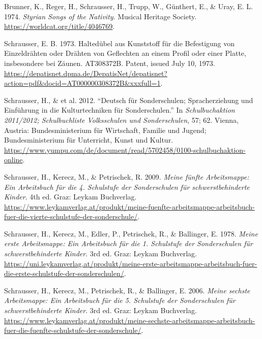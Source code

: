 \documentclass[
]{article}
\author{}
\date{}
\newlength{\cslhangindent}
\newlength{\cslentryspacingunit} %
\newenvironment{CSLReferences}[2] %
 {%
  \setlength{\parindent}{0pt}
  \ifodd #1
  \let\oldpar\par
  \def\par{\hangindent=\cslhangindent\oldpar}
  \fi
  \setlength{\parskip}{#2\cslentryspacingunit}
 }%
 {}
\begin{document}
\hypertarget{refs}{}
\begin{CSLReferences}{1}{0}
\leavevmode{}%
Brunner, K., Reger, H., Schrausser, H., Trupp, W., Günthert, E., \&
Uray, E. L. 1974. \emph{Styrian Songs of the Nativity}. Musical Heritage
Society. \url{https://worldcat.org/title/4046769}.

\leavevmode{}%
Schrausser, E. B. 1973. {Haltedübel aus Kunststoff für die Befestigung
von Einzeldrähten oder Drähten von Geflechten an einem Profil oder einer
Platte, insbesondere bei Zäunen}. AT308372B. Patent, issued July 10,
1973.
\url{https://depatisnet.dpma.de/DepatisNet/depatisnet?action=pdf\&docid=AT000000308372B\&xxxfull=1}.

\leavevmode{}%
Schrausser, H., \& et al. 2012. {``{Deutsch für Sonderschulen;
Spracherziehung und Einführung in die Kulturtechniken für
Sonderschulen}.''} In \emph{{Schulbuchaktion 2011/2012; Schulbuchliste
Volksschulen und Sonderschulen}}, 57; 62. {Vienna, Austria}:
{Bundesministerium für Wirtschaft, Familie und Jugend; Bundesministerium
für Unterricht, Kunst und Kultur}.
\url{https://www.yumpu.com/de/document/read/5702458/0100-schulbuchaktion-online}.

\leavevmode{}%
Schrausser, H., Kerecz, M., \& Petrischek, R. 2009. \emph{{Meine fünfte
Arbeitsmappe}: {Ein Arbeitsbuch für die 4. Schulstufe der Sonderschulen
für schwerstbehinderte Kinder}}. 4th ed. Graz: Leykam Buchverlag.
\url{https://www.leykamverlag.at/produkt/meine-fuenfte-arbeitsmappe-arbeitsbuch-fuer-die-vierte-schulstufe-der-sonderschule/}.

\leavevmode{}%
Schrausser, H., Kerecz, M., Edler, P., Petrischek, R., \& Ballinger, E.
1978. \emph{{Meine erste Arbeitsmappe}: {Ein Arbeitsbuch für die 1.
Schulstufe der Sonderschulen für schwerstbehinderte Kinder}}. 3rd ed.
Graz: Leykam Buchverlag.
\url{https://uni.leykamverlag.at/produkt/meine-erste-arbeitsmappe-arbeitsbuch-fuer-die-erste-schulstufe-der-sonderschulen/}.

\leavevmode{}%
Schrausser, H., Kerecz, M., Petrischek, R., \& Ballinger, E. 2006.
\emph{{Meine sechste Arbeitsmappe}: {Ein Arbeitsbuch für die 5.
Schulstufe der Sonderschulen für schwerstbehinderte Kinder}}. 3rd ed.
Graz: Leykam Buchverlag.
\url{https://www.leykamverlag.at/produkt/meine-sechste-arbeitsmappe-arbeitsbuch-fuer-die-fuenfte-schulstufe-der-sonderschule/}.

\end{CSLReferences}
\end{document}
